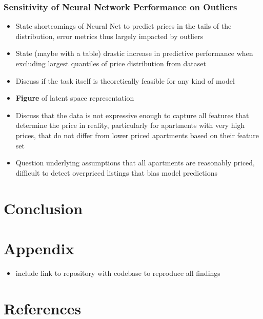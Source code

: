 \documentclass[12pt, letterpaper]{article}
\begin{document}
\subsubsection{Sensitivity of Neural Network Performance on Outliers}
\begin{itemize}
    \item State shortcomings of Neural Net to predict prices in the tails of the distribution, error metrics thus largely impacted by outliers
    \item State (maybe with a table) drastic increase in predictive performance when excluding largest quantiles of price distribution from dataset
    \item Discuss if the task itself is theoretically feasible for any kind of model
    \item \textbf{Figure} of latent space representation
    \item Discuss that the data is not expressive enough to capture all features that determine the price in reality, particularly for apartments with very high prices, that do not differ from lower priced apartments based on their feature set
    \item Question underlying assumptions that all apartments are reasonably priced, difficult to detect overpriced listings that bias model predictions
\end{itemize}


\section{Conclusion}


\section{Appendix}
\begin{itemize}
    \item include link to repository with codebase to reproduce all findings
\end{itemize}

\section{References}
\end{document}
